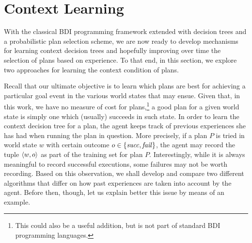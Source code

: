 \section{Context Learning}\label{sec:context_learning}

\newcommand{\success}{\mbox{\emph{succ}}}
\newcommand{\failure}{\mbox{\emph{fail}}}

With the classical BDI programming framework extended with decision trees and a
probabilistic plan selection scheme, we are now ready to develop mechanisms for
learning context decision trees and hopefully improving over time the selection
of plans based on experience.
To that end, in this section, we explore two approaches for learning the context
condition of plans.




Recall that our ultimate objective is to learn which plans are best for achieving
a particular goal event in the various world states that may ensue. Given that,
in this work, we have no measure of cost for plans,\footnote{This could also be a
useful addition, but is not part of standard BDI programming languages.} a good
plan for a given world state is simply one which (usually) succeeds in such
state. In order to learn the context decision tree for a plan, the agent keeps
track of previous experiences she has had when running the plan in question. More
precisely, if a plan $P$ is tried in world state $w$ with certain outcome $o \in
\{\success,\failure\}$, the agent may record the tuple $\langle w,o \rangle$ as part of
the training set for plan $P$.
Interestingly, while it is always meaningful to record successful executions,
some failures may not be worth recording. Based on this observation, we shall
develop and compare two different algorithms that differ on how past experiences
are taken into account by the agent. Before then, though, let us explain better
this issue by means of an example.
 

